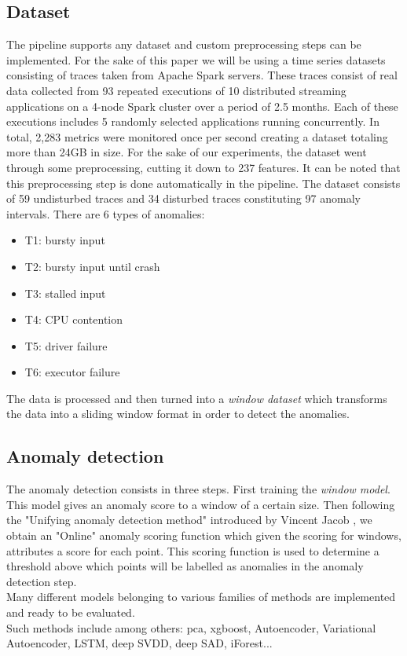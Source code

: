 \documentclass[oneside, a4paper, onecolumn, 11pt]{article}
\begin{document}
\subsection{Dataset}
The pipeline supports any dataset and custom preprocessing steps can be implemented. For the sake of this paper we will be using a time series datasets consisting of traces taken from Apache Spark servers. These traces consist of real data collected from 93 repeated executions of 10 distributed streaming applications on a 4-node Spark cluster over a period of 2.5 months. Each of these executions includes 5 randomly selected applications running concurrently. In total, 2,283 metrics were monitored once per second creating a dataset totaling more than 24GB in size. For the sake of our experiments, the dataset went through some preprocessing, cutting it down to 237 features. It can be noted that this preprocessing step is done automatically in the pipeline.
The dataset consists of 59 undisturbed traces and 34 disturbed traces constituting 97 anomaly intervals. There are 6 types of anomalies: 
\begin{itemize}
    \item T1: bursty input 
    \item T2: bursty input until crash
    \item T3: stalled input
    \item T4: CPU contention
    \item T5: driver failure
    \item T6: executor failure
\end{itemize}

The data is processed and then turned into a \textit{window dataset} which transforms the data into a sliding window format in order to detect the anomalies.

\subsection{Anomaly detection}
The anomaly detection consists in three steps. First training the \textit{window model}. This model gives an anomaly score to a window of a certain size. Then following the "Unifying anomaly detection method" introduced by Vincent Jacob \cite{Divad}, we obtain an "Online" anomaly scoring function which given the scoring for windows, attributes a score for each point. This scoring function is used to determine a threshold above which points will be labelled as anomalies in the anomaly detection step.\\
Many different models belonging to various families of methods \cite{Schmidl2022} are implemented and ready to be evaluated.\\
Such methods include among others: pca, xgboost, Autoencoder, Variational Autoencoder, LSTM, deep SVDD, deep SAD, iForest...\\
\end{document}
